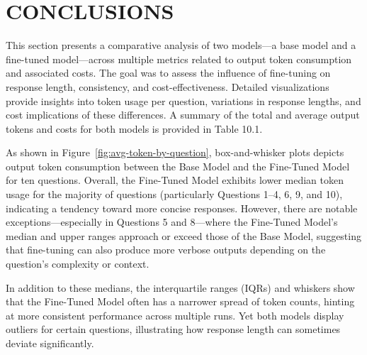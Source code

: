 \documentclass[12pt,oneside,openany]{report}
\begin{document}
\chapter{CONCLUSIONS}
This section presents a comparative analysis of two models—a base model and a fine-tuned model—across multiple metrics related to output token consumption and associated costs. The goal was to assess the influence of fine-tuning on response length, consistency, and cost-effectiveness. Detailed visualizations provide insights into token usage per question, variations in response lengths, and cost implications of these differences. A summary of the total and average output tokens and costs for both models is provided in Table 10.1.



\begin{table}[htbp]
    \centering
    \caption{Comparison of Token Usage and Cost}
    \label{tab:token_cost_comparison}
\end{table}





As shown in Figure~\ref{fig:avg-token-by-question},  box-and-whisker plots depicts output token consumption between the Base Model and the Fine-Tuned Model for ten questions. Overall, the Fine-Tuned Model exhibits lower median token usage for the majority of questions (particularly Questions 1–4, 6, 9, and 10), indicating a tendency toward more concise responses. However, there are notable exceptions—especially in Questions 5 and 8—where the Fine-Tuned Model’s median and upper ranges approach or exceed those of the Base Model, suggesting that fine-tuning can also produce more verbose outputs depending on the question’s complexity or context.

In addition to these medians, the interquartile ranges (IQRs) and whiskers show that the Fine-Tuned Model often has a narrower spread of token counts, hinting at more consistent performance across multiple runs. Yet both models display outliers for certain questions, illustrating how response length can sometimes deviate significantly. 
\end{document}
